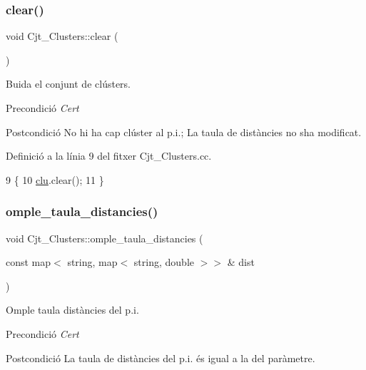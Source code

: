 \subsubsection{\texorpdfstring{clear()}{clear()}}
{\footnotesize\ttfamily void Cjt\+\_\+\+Clusters\+::clear (\begin{DoxyParamCaption}{ }\end{DoxyParamCaption})}



Buida el conjunt de clústers. 

\begin{DoxyPrecond}{Precondició}
{\itshape Cert} 
\end{DoxyPrecond}
\begin{DoxyPostcond}{Postcondició}
No hi ha cap clúster al p.\+i.; La taula de distàncies no s\textquotesingle{}ha modificat. 
\end{DoxyPostcond}


Definició a la línia 9 del fitxer Cjt\+\_\+\+Clusters.\+cc.


\begin{DoxyCode}
9                          \{
10     \hyperlink{class_cjt___clusters_a86fd6089c4e49eaedea86d5ec4ee6495}{clu}.clear();
11 \}
\end{DoxyCode}
\mbox{\label{class_cjt___clusters_af1bf97b420bf3933bfe2ba9904e01241}} 
\subsubsection{\texorpdfstring{omple\+\_\+taula\+\_\+distancies()}{omple\_taula\_distancies()}}
{\footnotesize\ttfamily void Cjt\+\_\+\+Clusters\+::omple\+\_\+taula\+\_\+distancies (\begin{DoxyParamCaption}\item[{const map$<$ string, map$<$ string, double $>$$>$ \&}]{dist }\end{DoxyParamCaption})}



Omple taula distàncies del p.\+i. 

\begin{DoxyPrecond}{Precondició}
{\itshape Cert} 
\end{DoxyPrecond}
\begin{DoxyPostcond}{Postcondició}
La taula de distàncies del p.\+i. és igual a la del paràmetre. 
\end{DoxyPostcond}


